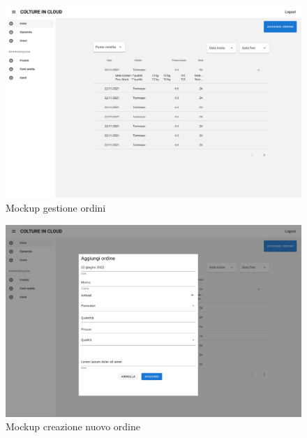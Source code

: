 \documentclass[italian]{report}
\begin{document}
\begin{figure}[htp]
    \centering
    \includegraphics[width=\textwidth]{assets/mockup_orders.jpg}
    \caption{Mockup gestione ordini}
    \label{fig:getOrders}
\end{figure}
\begin{figure}[htp]
    \centering
    \includegraphics[width=\textwidth]{assets/mockup_add_order.jpg}
    \caption{Mockup creazione nuovo ordine}
    \label{fig:addOrder}
\end{figure}
\end{document}
